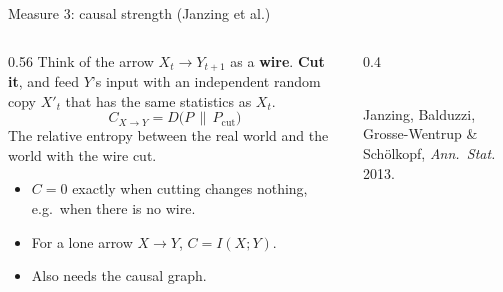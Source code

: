 \documentclass[aspectratio=169,11pt,xcolor={table}]{beamer}
\newcommand{\Xt}{X_t}
\newcommand{\Yn}{Y_{t+1}}
\newcommand{\xmark}{{\color{sOrange}\ding{55}}}
\newcommand{\aside}[1]{{\color{muted}\small #1}}
\begin{document}
\begin{frame}{Measure 3: causal strength (Janzing et al.)}
  \begin{columns}[c]
    \begin{column}{0.56\textwidth}
      Think of the arrow $\Xt \to \Yn$ as a \textbf{wire}. \textbf{Cut it}, and feed $Y$'s input
      with an independent random copy $X'_t$ that has the same statistics as $\Xt$.
      \[ C_{X \to Y} = D\big(P \,\|\, P_{\text{cut}}\big) \]
      The relative entropy between the real world and the world with the wire cut.
      \begin{itemize}
        \item $C = 0$ exactly when cutting changes nothing, e.g.\ when there is no wire.
        \item For a lone arrow $X \to Y$, $C = I(X;Y)$.
        \item[\xmark] Also needs the causal graph.
      \end{itemize}
    \end{column}
    \begin{column}{0.4\textwidth}
      \centering
      \\[3mm]
      \aside{Janzing, Balduzzi, Grosse-Wentrup \& Sch\"olkopf, \emph{Ann.\ Stat.} 2013.}
    \end{column}
  \end{columns}
\end{frame}
\end{document}
